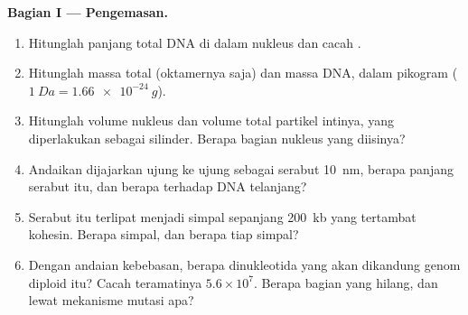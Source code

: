\begin{problem}
\medskip
\noindent\textbf{Bagian I --- Pengemasan.}
\begin{enumerate}
  \item Hitunglah panjang total DNA di dalam nukleus dan cacah
        .
  \item Hitunglah massa total  (oktamernya saja) dan massa DNA,
        dalam pikogram ($\qty{1}{Da} = \qty{1.66e-24}{g}$).
  \item Hitunglah volume nukleus dan volume total partikel intinya, yang
        diperlakukan sebagai silinder. Berapa bagian nukleus yang
        diisinya?
  \item Andaikan  dijajarkan ujung ke ujung sebagai serabut
        \qty{10}{nm}, berapa panjang serabut itu, dan berapa  terhadap DNA telanjang?
  \item Serabut itu terlipat menjadi simpal sepanjang \qty{200}{kb} yang
        tertambat kohesin. Berapa simpal, dan berapa  tiap simpal?
  \item Dengan andaian kebebasan, berapa dinukleotida  yang akan
        dikandung genom diploid itu? Cacah teramatinya
        $5.6\times 10^{7}$. Berapa bagian yang hilang, dan lewat
        mekanisme mutasi apa?
\end{enumerate}


\end{problem}
